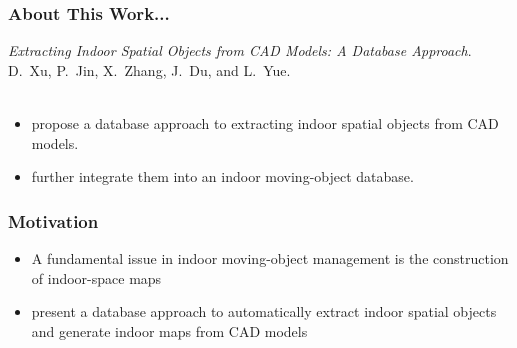 \begin{frame}
\frametitle{About This Work...}

\emph{Extracting Indoor Spatial Objects from CAD Models: A Database Approach}.~\cite{xu2015extracting} \\
D.~Xu, P.~Jin, X.~Zhang, J.~Du, and L.~Yue.\\~\\

\begin{itemize}
  \item propose a database approach to extracting indoor spatial objects from CAD models.
  \item further integrate them into an indoor moving-object database.
\end{itemize}

\end{frame}


\begin{frame}
\frametitle{Motivation}

\begin{itemize}
  \item A fundamental issue in indoor moving-object management is the construction of indoor-space maps

  \item present a database approach to automatically extract indoor spatial objects and generate indoor maps from CAD models
\end{itemize}

\end{frame}


